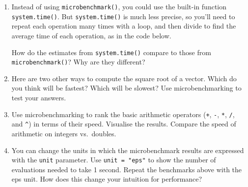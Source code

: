\begin{enumerate}
\def\labelenumi{\arabic{enumi}.}
\item
  Instead of using \texttt{microbenchmark()}, you could use the built-in
  function \texttt{system.time()}. But \texttt{system.time()} is much
  less precise, so you'll need to repeat each operation many times with
  a loop, and then divide to find the average time of each operation, as
  in the code below.

\begin{Shaded}
\begin{Highlighting}[]
\StringTok{ }\OperatorTok{:}
\NormalTok{(} \OperatorTok{:}\OperatorTok{/}\StringTok{ }
\NormalTok{(} \OperatorTok{:}\OperatorTok{^}\StringTok{ }\NormalTok{) }\OperatorTok{/}\StringTok{ }
\end{Highlighting}
\end{Shaded}

  How do the estimates from \texttt{system.time()} compare to those from
  \texttt{microbenchmark()}? Why are they different?
\item
  Here are two other ways to compute the square root of a vector. Which
  do you think will be fastest? Which will be slowest? Use
  microbenchmarking to test your answers.

\begin{Shaded}
\begin{Highlighting}[]
\OperatorTok{^}\StringTok{ }\NormalTok{(} \OperatorTok{/}\StringTok{ }\NormalTok{)}
\NormalTok{(}\OperatorTok{/}\StringTok{ }\NormalTok{)}
\end{Highlighting}
\end{Shaded}
\item
  Use microbenchmarking to rank the basic arithmetic operators
  (\texttt{+}, \texttt{-}, \texttt{*}, \texttt{/}, and \texttt{\^{}}) in
  terms of their speed. Visualise the results. Compare the speed of
  arithmetic on integers vs.~doubles.
\item
  You can change the units in which the microbenchmark results are
  expressed with the \texttt{unit} parameter. Use
  \texttt{unit\ =\ "eps"} to show the number of evaluations needed to
  take 1 second. Repeat the benchmarks above with the eps unit. How does
  this change your intuition for performance?
\end{enumerate}

